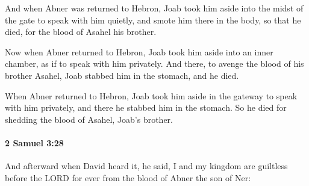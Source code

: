 			\begin{versebox}
					\item[BHS] 
					\item[ASV] And when Abner was returned to Hebron, Joab took him aside into the midst of the gate to speak with him quietly, and smote him there in the body, so that he died, for the blood of Asahel his brother.
					\item[NIV] Now when Abner returned to Hebron, Joab took him aside into an inner chamber, as if to speak with him privately. And there, to avenge the blood of his brother Asahel, Joab stabbed him in the stomach, and he died.
					\item[NRSV] When Abner returned to Hebron, Joab took him aside in the gateway to speak with him privately, and there he stabbed him in the stomach. So he died for shedding the blood of Asahel, Joab’s brother.
			\end{versebox}

		\paragraph{2 Samuel 3:28} %
			\label{2SAMUEL-3-28}

			And afterward when David heard it, he said, I and my kingdom are guiltless before the LORD for ever from the blood of Abner the son of Ner:

